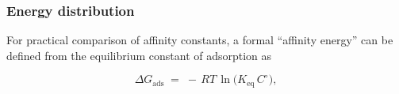 \documentclass[journal=jacsat,manuscript=article]{achemso}
\begin{document}

\subsubsection{Energy distribution}

For practical comparison of affinity constants, a formal ``affinity energy'' can be defined from the equilibrium constant of adsorption as

\begin{equation}
	\Delta G_{\mathrm{ads}} \;=\; -\,RT\,\ln\!\big(K_{\mathrm{eq}}\,C^\circ\big),
\end{equation}
\end{document}
